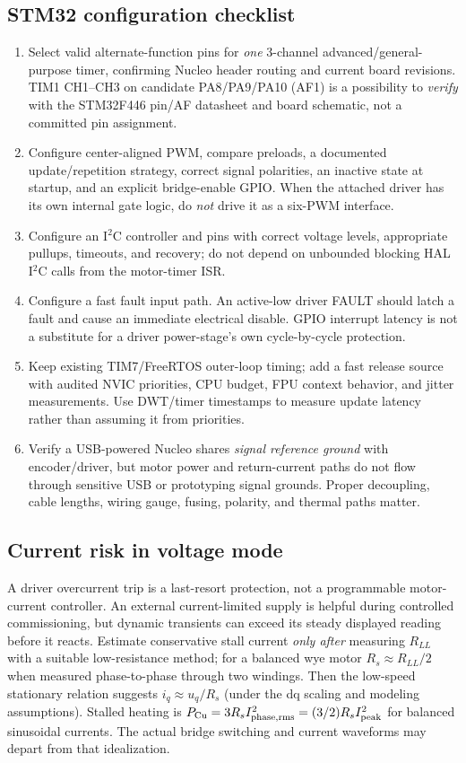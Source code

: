 \documentclass[10pt,letterpaper]{article}
\begin{document}
\subsection{STM32 configuration checklist}
\begin{enumerate}
\item Select valid alternate-function pins for \emph{one} 3-channel advanced/general-purpose timer, confirming Nucleo header routing and current board revisions. TIM1 CH1--CH3 on candidate PA8/PA9/PA10 (AF1) is a possibility to \emph{verify} with the STM32F446 pin/AF datasheet and board schematic, not a committed pin assignment.
\item Configure center-aligned PWM, compare preloads, a documented update/repetition strategy, correct signal polarities, an inactive state at startup, and an explicit bridge-enable GPIO. When the attached driver has its own internal gate logic, do \emph{not} drive it as a six-PWM interface.
\item Configure an I$^2$C controller and pins with correct voltage levels, appropriate pullups, timeouts, and recovery; do not depend on unbounded blocking HAL I$^2$C calls from the motor-timer ISR.
\item Configure a fast fault input path. An active-low driver FAULT should latch a fault and cause an immediate electrical disable. GPIO interrupt latency is not a substitute for a driver power-stage's own cycle-by-cycle protection.
\item Keep existing TIM7/FreeRTOS outer-loop timing; add a fast release source with audited NVIC priorities, CPU budget, FPU context behavior, and jitter measurements. Use DWT/timer timestamps to measure update latency rather than assuming it from priorities.
\item Verify a USB-powered Nucleo shares \emph{signal reference ground} with encoder/driver, but motor power and return-current paths do not flow through sensitive USB or prototyping signal grounds. Proper decoupling, cable lengths, wiring gauge, fusing, polarity, and thermal paths matter.
\end{enumerate}

\subsection{Current risk in voltage mode}
A driver overcurrent trip is a last-resort protection, not a programmable motor-current controller. An external current-limited supply is helpful during controlled commissioning, but dynamic transients can exceed its steady displayed reading before it reacts. Estimate conservative stall current \emph{only after} measuring $R_{LL}$ with a suitable low-resistance method; for a balanced wye motor $R_s\approx R_{LL}/2$ when measured phase-to-phase through two windings. Then the low-speed stationary relation suggests $i_q\approx u_q/R_s$ (under the dq scaling and modeling assumptions). Stalled heating is $P_{\rm Cu}=3R_s I_{\rm phase,rms}^2=(3/2)R_s I_{\rm peak}^2$ for balanced sinusoidal currents. The actual bridge switching and current waveforms may depart from that idealization.
\end{document}
